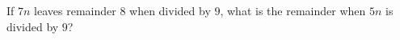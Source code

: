 If $7n$ leaves remainder $8$ when divided by $9$, what is the remainder when $5n$ is divided by $9$?
